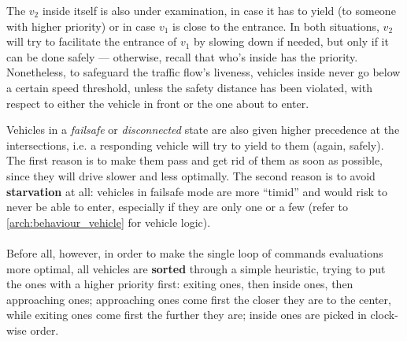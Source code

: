 The $v_2$ inside itself is also under examination, in case it has to yield (to
someone with higher priority) or in case $v_1$ is close to the entrance. In both
situations, $v_2$ will try to facilitate the entrance of $v_1$ by slowing down
if needed, but only if it can be done safely --- otherwise, recall that who's
inside has the priority. Nonetheless, to safeguard the traffic flow's liveness,
vehicles inside never go below a certain speed threshold, unless the safety
distance has been violated, with respect to either the vehicle in front or the
one about to enter.

Vehicles in a \textit{failsafe} or \textit{disconnected} state are also
given higher precedence at the intersections, i.e. a responding vehicle will try
to yield to them (again, safely). The first reason is to make them pass and get
rid of them as soon as possible, since they will drive slower and less
optimally. The second reason is to avoid \textbf{starvation} at all: vehicles in
failsafe mode are more ``timid'' and would risk to never be able to enter,
especially if they are only one or a few (refer to \ref{arch:behaviour_vehicle}
for vehicle logic).
\\
\\
Before all, however, in order to make the single loop of commands evaluations
more optimal, all vehicles are \textbf{sorted} through a simple heuristic,
trying to put the ones with a higher priority first: exiting ones, then inside
ones, then approaching ones; approaching ones come first the closer they are to
the center, while exiting ones come first the further they are; inside ones are
picked in clock-wise order.

